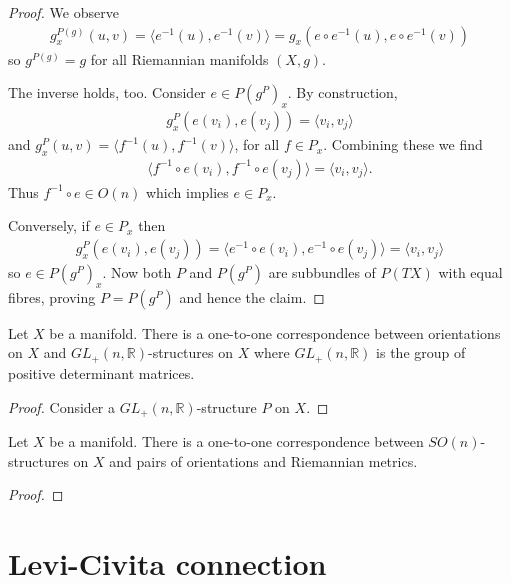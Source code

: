 \documentclass{article}
\begin{document}
\begin{theorem}
\begin{proof}
    We observe
    \begin{align*}
      g^{P(g)}_x(u,v) = \langle {e}^{-1}(u),{e}^{-1}(v)\rangle
      = g_x(e\circ{e}^{-1}(u), e\circ{e}^{-1}(v))
    \end{align*}
    so $g^{P(g)}=g$ for all Riemannian manifolds $(X,g)$.

    The inverse holds, too. Consider $e\in P(g^P)_x$. By construction,
    \begin{align*}
      g^P_x(e(v_i),e(v_j))=\langle v_i, v_j\rangle
    \end{align*}
    and $g^P_x(u,v)=\langle{f}^{-1}(u),{f}^{-1}(v)\rangle$,
    for all $f\in P_x$. Combining these we find
    \begin{align*}
      \langle {f}^{-1}\circ e(v_i), {f}^{-1}\circ e(v_j)\rangle
      = \langle v_i, v_j\rangle.
    \end{align*}
    Thus ${f}^{-1}\circ e\in O(n)$ which implies $e\in P_x$.

    Conversely, if $e\in P_x$ then
    \begin{align*}
      g_x^P(e(v_i),e(v_j)) = \langle {e}^{-1}\circ e(v_i),{e}^{-1}\circ e(v_j)\rangle = \langle v_i,v_j\rangle
    \end{align*}
    so $e\in P(g^P)_x$. Now both $P$ and $P(g^P)$ are subbundles
    of $P(TX)$ with equal fibres, proving $P=P(g^P)$ and hence the claim.
  \end{proof}
\end{theorem}

\begin{theorem}
  Let $X$ be a manifold. There is a one-to-one correspondence between
  orientations on $X$ and $GL_+(n,\mathbb{R})$-structures on $X$
  where $GL_+(n,\mathbb{R})$ is the group of positive determinant
  matrices.
  \begin{proof}
    Consider a $GL_+(n,\mathbb{R})$-structure $P$ on $X$.
    \missingproof
  \end{proof}
\end{theorem}

\begin{theorem}
  Let $X$ be a manifold. There is a one-to-one correspondence between
  $SO(n)$-structures on $X$ and pairs of orientations and Riemannian
  metrics.
  \begin{proof}
    \missingproof
  \end{proof}
\end{theorem}

\section{Levi-Civita connection}
\end{document}
